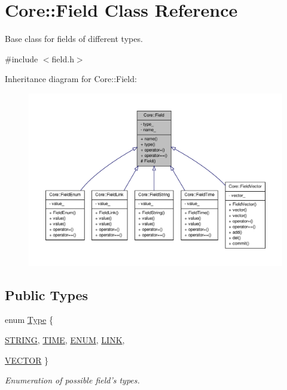 \hypertarget{classCore_1_1Field}{
\section{Core::Field Class Reference}
\label{dc/d16/classCore_1_1Field}
}


Base class for fields of different types.  




{\ttfamily \#include $<$field.h$>$}



Inheritance diagram for Core::Field:
\nopagebreak
\begin{figure}[H]
\begin{center}
\leavevmode
\includegraphics[width=400pt]{d1/dae/classCore_1_1Field__inherit__graph}
\end{center}
\end{figure}
\subsection*{Public Types}
\begin{DoxyCompactItemize}
\item 
enum \hyperlink{classCore_1_1Field_abd8b92d37ab4c79a2a15ec647c38cc9f}{Type} \{ \par
\hyperlink{classCore_1_1Field_abd8b92d37ab4c79a2a15ec647c38cc9fa286532cb5e3b52e8a222bed52a0ef230}{STRING}, 
\hyperlink{classCore_1_1Field_abd8b92d37ab4c79a2a15ec647c38cc9face3d1796b60e1f8a33a3ba5fc05e183d}{TIME}, 
\hyperlink{classCore_1_1Field_abd8b92d37ab4c79a2a15ec647c38cc9fa2b11372a326173242efdcb15bd28c567}{ENUM}, 
\hyperlink{classCore_1_1Field_abd8b92d37ab4c79a2a15ec647c38cc9fa9df866ca894748e77c04eda4bc9d32ee}{LINK}, 
\par
\hyperlink{classCore_1_1Field_abd8b92d37ab4c79a2a15ec647c38cc9fa57e09ea5a6d18aa8ebfae9c9bdcc9509}{VECTOR}
 \}
\begin{DoxyCompactList}\small\item\em Enumeration of possible field's types. \item\end{DoxyCompactList}\end{DoxyCompactItemize}

